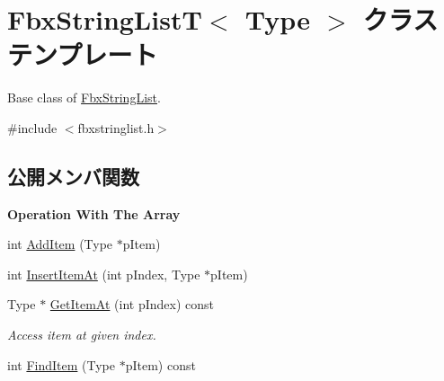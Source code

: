 \hypertarget{class_fbx_string_list_t}{}\section{Fbx\+String\+ListT$<$ Type $>$ クラステンプレート}
\label{class_fbx_string_list_t}


Base class of \hyperlink{class_fbx_string_list}{Fbx\+String\+List}.  




{\ttfamily \#include $<$fbxstringlist.\+h$>$}

\subsection*{公開メンバ関数}
\begin{Indent}\textbf{ Operation With The Array}\par
\begin{DoxyCompactItemize}
\item 
int \hyperlink{class_fbx_string_list_t_aa8dfd9f7ca27dafca1f2c80aa8590a19}{Add\+Item} (Type $\ast$p\+Item)
\item 
int \hyperlink{class_fbx_string_list_t_aa9bd662d4638b711c615e37a9038a038}{Insert\+Item\+At} (int p\+Index, Type $\ast$p\+Item)
\item 
Type $\ast$ \hyperlink{class_fbx_string_list_t_a86ee3c651fea2cb1fe50896bc93ef685}{Get\+Item\+At} (int p\+Index) const
\begin{DoxyCompactList}\small\item\em Access item at given index. \end{DoxyCompactList}\item 
int \hyperlink{class_fbx_string_list_t_a9d903a2352e10982c18d3e37fcc58ef6}{Find\+Item} (Type $\ast$p\+Item) const
\end{DoxyCompactItemize}
\end{Indent}
